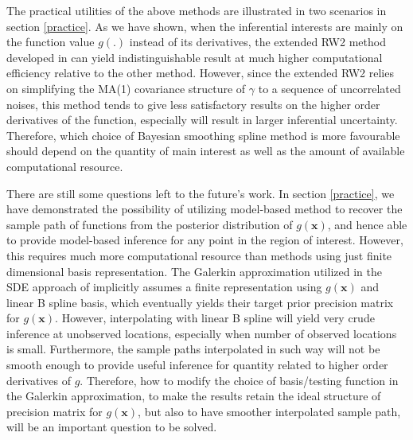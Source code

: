 \documentclass{article}
\begin{document}
The practical utilities of the above methods are illustrated in two scenarios in section \ref{practice}. As we have shown, when the inferential interests are mainly on the function value $g(.)$ instead of its derivatives, the extended RW2 method developed in \cite{rw2} can yield indistinguishable result at much higher computational efficiency relative to the other method. However, since the extended RW2 relies on simplifying the MA(1) covariance structure of $\gamma$ to a sequence of uncorrelated noises, this method tends to give less satisfactory results on the higher order derivatives of the function, especially will result in larger inferential uncertainty. Therefore, which choice of Bayesian smoothing spline method is more favourable should depend on the quantity of main interest as well as the amount of available computational resource.

There are still some questions left to the future's work. In section \ref{practice}, we have demonstrated the possibility of utilizing model-based method to recover the sample path of functions from the posterior distribution of $g(\boldsymbol{x})$, and hence able to provide model-based inference for any point in the region of interest. However, this requires much more computational resource than methods using just finite dimensional basis representation. The Galerkin approximation utilized in the SDE approach of \cite{rw2} implicitly assumes a finite representation using $g(\boldsymbol{x})$ and linear B spline basis, which eventually yields their target prior precision matrix for $g(\boldsymbol{x})$. However, interpolating with linear B spline will yield very crude inference at unobserved locations, especially when number of observed locations is small. Furthermore, the sample paths interpolated in such way will not be smooth enough to provide useful inference for quantity related to higher order derivatives of $g$. Therefore, how to modify the choice of basis/testing function in the Galerkin approximation, to make the results retain the ideal structure of precision matrix for $g(\boldsymbol{x})$, but also to have smoother interpolated sample path, will be an important question to be solved.








\newpage


\end{document}
